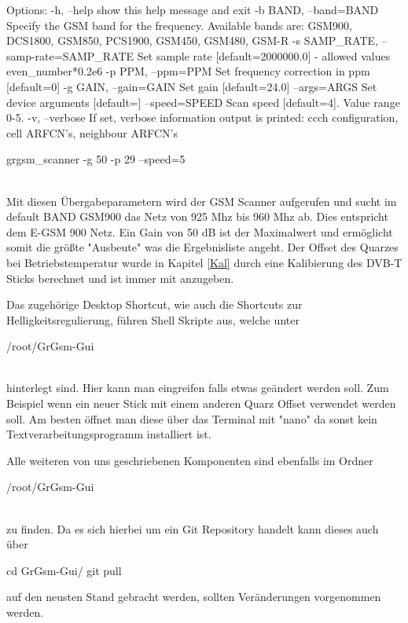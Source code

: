 \begin{code}
Options:
  -h, --help            show this help message and exit
  -b BAND, --band=BAND  Specify the GSM band for the frequency. Available
                        bands are: GSM900, DCS1800, GSM850, PCS1900, GSM450,
                        GSM480, GSM-R
  -s SAMP_RATE, --samp-rate=SAMP_RATE
                        Set sample rate [default=2000000.0] - allowed values
                        even_number*0.2e6
  -p PPM, --ppm=PPM     Set frequency correction in ppm [default=0]
  -g GAIN, --gain=GAIN  Set gain [default=24.0]
  --args=ARGS           Set device arguments [default=]
  --speed=SPEED         Scan speed [default=4]. Value range 0-5.
  -v, --verbose         If set, verbose information output is printed: ccch
                        configuration, cell ARFCN's, neighbour ARFCN's
                        
                   
grgsm_scanner -g 50 -p 29 --speed=5
\end{code}
\noindent\\Mit diesen Übergabeparametern wird der \ac{GSM} Scanner aufgerufen und sucht im default BAND GSM900 das Netz von 925 Mhz bis 960 Mhz ab. Dies entspricht dem E-GSM 900 Netz. Ein Gain von 50 dB ist der Maximalwert und ermöglicht somit die größte "Ausbeute" was die Ergebnisliste angeht. Der Offset des Quarzes bei Betriebstemperatur wurde in Kapitel \ref{Kal} durch eine Kalibierung des DVB-T Sticks berechnet und ist immer mit anzugeben. 

Das zugehörige Desktop Shortcut, wie auch die Shortcuts zur Helligkeitsregulierung, führen Shell Skripte aus, welche unter 
\begin{code}
/root/GrGsm-Gui
\end{code}
\noindent\\hinterlegt sind. Hier kann man eingreifen falls etwas geändert werden soll. Zum Beispiel wenn ein neuer Stick mit einem anderen Quarz Offset verwendet werden soll. Am besten öffnet man diese über das Terminal mit "nano" da sonst kein Textverarbeitungsprogramm installiert ist. 

Alle weiteren von uns geschriebenen Komponenten sind ebenfalls im Ordner 
\begin{code}
/root/GrGsm-Gui
\end{code}
\noindent\\zu finden. Da es sich hierbei um ein Git Repository handelt kann dieses auch über 
\begin{code}
cd GrGsm-Gui/
git pull
\end{code}
auf den neusten Stand gebracht werden, sollten Veränderungen vorgenommen werden. 

